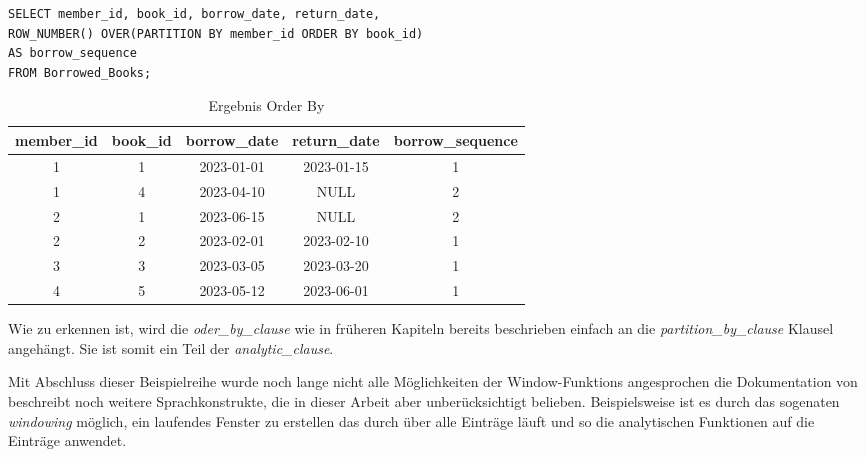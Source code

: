 \begin{lstlisting}
SELECT member_id, book_id, borrow_date, return_date,
ROW_NUMBER() OVER(PARTITION BY member_id ORDER BY book_id)
AS borrow_sequence
FROM Borrowed_Books;
\end{lstlisting}
\begin{table}[h]
	\centering
	\begin{tabular}{|c|c|c|c|c|}
		\hline
		\textbf{member\_id} & \textbf{book\_id} & \textbf{borrow\_date} & \textbf{return\_date} & \textbf{borrow\_sequence} \\
		\hline
		1                   & 1                 & 2023-01-01            & 2023-01-15            & 1                         \\
		\hline
		1                   & 4                 & 2023-04-10            & NULL                  & 2                         \\
		\hline
		2                   & 1                 & 2023-06-15            & NULL                  & 2                         \\
		\hline
		2                   & 2                 & 2023-02-01            & 2023-02-10            & 1                         \\
		\hline
		3                   & 3                 & 2023-03-05            & 2023-03-20            & 1                         \\
		\hline
		4                   & 5                 & 2023-05-12            & 2023-06-01            & 1                         \\
		\hline
	\end{tabular}
	\caption{Ergebnis Order By}
	\label{tab:ergebnis_oder_by}
\end{table}

Wie zu erkennen ist, wird die \textit{oder\_by\_clause} wie in früheren Kapiteln
bereits beschrieben einfach an die \textit{partition\_by\_clause} Klausel angehängt.
Sie ist somit ein Teil der \textit{analytic\_clause}.

Mit Abschluss dieser Beispielreihe wurde noch lange nicht alle Möglichkeiten der
Window-Funktions angesprochen die Dokumentation von \citet{oracle} beschreibt
noch weitere Sprachkonstrukte, die in dieser Arbeit aber unberücksichtigt belieben.
Beispielsweise ist es durch das sogenaten \textit{windowing} möglich, ein
laufendes Fenster zu erstellen das durch über alle Einträge läuft und so die
analytischen Funktionen auf die Einträge anwendet.

